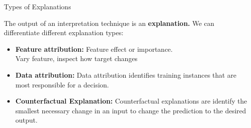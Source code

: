 \documentclass[11pt,compress,t,notes=noshow, aspectratio=169, xcolor=table]{beamer}
\begin{document}
\begin{vbframe}{Types of Explanations}

	The output of an interpretation technique is an \textbf{explanation.} We can differentiate different explanation types:
    
    \bigskip
	\begin{itemize}

    \itemsep2em
	\item 
		\textbf{Feature attribution:} Feature effect or importance.
		\\
		\smallskip
		Vary feature, inspect how target changes
	
	\item 
		\textbf{Data attribution:} Data attribution identifies  training instances that are most responsible for a decision.

	\item 
	   \textbf{Counterfactual Explanation:} 
	   Counterfactual explanations are identify the smallest necessary change in an input to change the prediction to the desired output.
	   \\
	  
	\end{itemize}
	
\end{vbframe}

	
	

\end{document}
